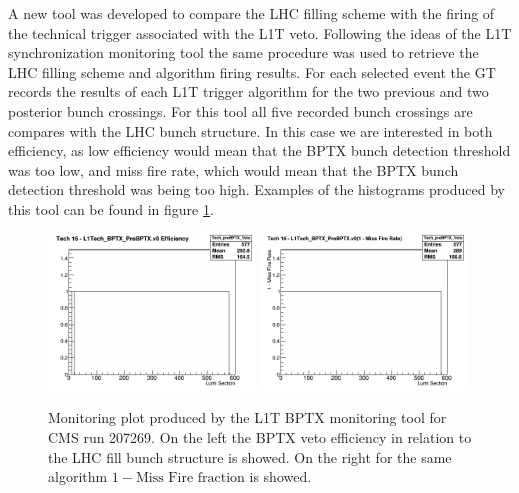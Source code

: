 A new tool was developed to compare the \gls{LHC} filling scheme with the firing of the technical trigger associated with the \gls{L1T} veto. Following the ideas of the \gls{L1T} synchronization monitoring tool the same procedure was used to retrieve the \gls{LHC} filling scheme and algorithm firing results. For each selected event the \gls{GT} records the results of each \gls{L1T} trigger algorithm for the two previous and two posterior bunch crossings. For this tool all five recorded bunch crossings are compares with the \gls{LHC} bunch structure. In this case we are interested in both efficiency, as low efficiency would mean that the \gls{BPTX} bunch detection threshold was too low, and miss fire rate, which would mean that the \gls{BPTX} bunch detection threshold was being too high. Examples of the histograms produced by this tool can be found in figure \ref{FIGURE:TechnicalWork_BPTXMonitoring}.

\begin{figure}[!htb]
\centering
\includegraphics[width=0.49\textwidth]{Chapter03/L1TOnline/Images/L1TDQM_Online_Run207269_L1TBPTX_Efficiency_Tech_preBPTX_Veto.png}
\includegraphics[width=0.49\textwidth]{Chapter03/L1TOnline/Images/L1TDQM_Online_Run207269_L1TBPTX_MissFire_Tech_preBPTX_Veto.png}
\caption{Monitoring plot produced by the \gls{L1T} \gls{BPTX} monitoring tool for \gls{CMS} run 207269. On the left the \gls{BPTX} veto efficiency in relation to the \gls{LHC} fill bunch structure is showed. On the right for the same algorithm $1 - \text{Miss Fire fraction}$ is showed.}
\label{FIGURE:TechnicalWork_BPTXMonitoring}
\end{figure}

